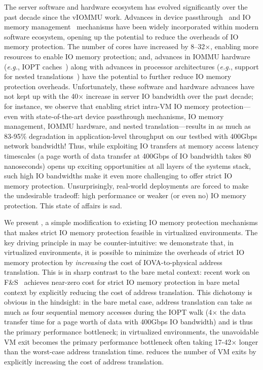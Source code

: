 The server software and hardware ecosystem has evolved significantly over the past decade since the vIOMMU work. 
Advances in device passthrough~\cite{intel_vtd_spec, amd_iommu_spec, arm_smmu_spec, Wang2025ToPRI, Guo2024VPRI} 
    and IO memory management~\cite{markuze2018damn} mechanisms have been widely incorporated within modern software ecosystem, 
    opening up the potential to reduce the overheads of IO memory protection. 
The number of cores have increased by 8--32$\times$, 
    enabling more resources to enable IO memory protection; 
    and, advances in IOMMU hardware (\textit{e.g.}, IOPT caches~\cite{Rubin2024FastSafe}) 
    along with advances in processor architectures (\textit{e.g.}, 
    support for nested translations~\cite{intel_vtd_spec}) have the potential to further reduce IO memory protection overheads. 
Unfortunately, these software and hardware advances have not kept up with the 40$\times$ 
    increase in server IO bandwidth over the past decade; 
    for instance, we observe that enabling strict intra-VM IO memory protection---even with state-of-the-art device passthrough 
    mechanisms, IO memory management, IOMMU hardware, and nested translation---results in 
    as much as 83-95$\%$ degradation in application-level throughput 
    on our testbed with 400Gbps network bandwidth! 
Thus, while exploiting IO transfers at memory access latency timescales 
    (a page worth of data transfer at 400Gbps of IO bandwidth takes 80 nanoseconds) 
    opens up exciting opportunities at all layers of the systems stack, 
    such high IO bandwidths make it even more challenging to offer strict IO memory protection. 
Unsurprisingly, real-world deployments are forced to make the undesirable tradeoff: 
    high performance or weaker (or even no) IO memory protection. This state of affairs is sad. 

We present {\vfreename}, a simple modification to existing IO memory protection mechanisms 
    that makes strict IO memory protection feasible in virtualized environments. 
The key driving principle in {\vfreename} may be counter-intuitive: 
    we demonstrate that, in virtualized environments, it is possible to minimize the overheads 
    of strict IO memory protection by \textit{increasing} the cost of IOVA-to-physical address translation. 
    This is in sharp contrast to the bare metal context: recent work on F\&S~\cite{Rubin2024FastSafe} 
    achieves near-zero cost for strict IO memory protection in bare metal context by explicitly 
    reducing the cost of address translation. 
This dichotomy is obvious in the hindsight: in the bare metal case, address translation 
    can take as much as four sequential memory accesses during the IOPT walk (4$\times$ the data transfer 
    time for a page worth of data with 400Gbps IO bandwidth) 
    and is thus the primary performance bottleneck; in virtualized environments, 
    the unavoidable VM exit becomes the primary performance bottleneck often taking 17-42$\times$ 
    longer than the worst-case address translation time. 
{\vfreename} reduces the number of VM exits by explicitly increasing the cost of address translation. 

